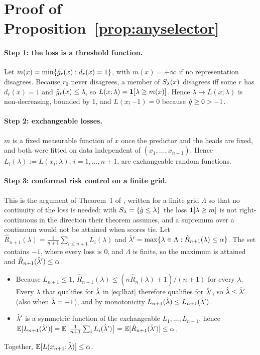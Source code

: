 \section{Proof of Proposition~\ref{prop:anyselector}}
\label{app:proof}

\paragraph{Step 1: the loss is a threshold function.} Let $m(x) = \min\{\hat g_r(x) : d_r(x) = 1\}$,
with $m(x) = +\infty$ if no representation disagrees. Because $r_0$ never disagrees, a member of
$S_{\lambda}(x)$ disagrees iff some $r$ has $d_r(x) = 1$ and $\hat g_r(x) \le \lambda$, so
$L(x;\lambda) = \mathbf{1}[\lambda \ge m(x)]$. Hence $\lambda \mapsto L(x;\lambda)$ is non-decreasing,
bounded by 1, and $L(x;-1) = 0$ because $\hat g \ge 0 > -1$.

\paragraph{Step 2: exchangeable losses.} $m$ is a fixed measurable function of $x$ once the
predictor and the heads are fixed, and both were fitted on data independent of
$(x_1,\dots,x_{n+1})$. Hence $L_i(\lambda) := L(x_i;\lambda)$, $i = 1,\dots,n+1$, are exchangeable
random functions.

\paragraph{Step 3: conformal risk control on a finite grid.} This is the argument of Theorem~1 of
\cite{angelopoulos2024crc}, written for a finite grid $\Lambda$ so that no continuity of the loss
is needed: with $S_{\lambda} = \{\hat g \le \lambda\}$ the loss $\mathbf{1}[\lambda \ge m]$ is not right-continuous
in the direction their theorem assumes, and a supremum over a continuum would not be attained when
scores tie. Let $\hat R_{n+1}(\lambda) = \frac{1}{n+1}\sum_{i\le n+1} L_i(\lambda)$ and
$\hat\lambda' = \max\{\lambda \in \Lambda : \hat R_{n+1}(\lambda) \le \alpha\}$. The set contains $-1$,
where every loss is 0, and $\Lambda$ is finite, so the maximum is attained and
$\hat R_{n+1}(\hat\lambda') \le \alpha$.
\begin{itemize}
  \item Because $L_{n+1} \le 1$, $\hat R_{n+1}(\lambda) \le (n\hat R_n(\lambda) + 1)/(n+1)$ for
  every $\lambda$. Every $\lambda$ that qualifies for $\hat\lambda$ in \eqref{eq:lhat} therefore qualifies
  for $\hat\lambda'$, so $\hat\lambda \le \hat\lambda'$ (also when $\hat\lambda = -1$), and by monotonicity
  $L_{n+1}(\hat\lambda) \le L_{n+1}(\hat\lambda')$.
  \item $\hat\lambda'$ is a symmetric function of the exchangeable $L_1,\dots,L_{n+1}$, hence
  $\mathbb{E}[L_{n+1}(\hat\lambda')] = \mathbb{E}\bigl[\frac{1}{n+1}\sum_i L_i(\hat\lambda')\bigr] = \mathbb{E}[\hat R_{n+1}(\hat\lambda')] \le
  \alpha$.
\end{itemize}
Together, $\mathbb{E}[L(x_{n+1};\hat\lambda)] \le \alpha$.

